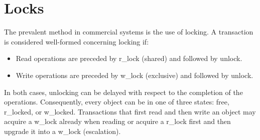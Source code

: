 \section{Locks}

The prevalent method in commercial systems is the use of locking. 
A transaction is considered well-formed concerning locking if:
\begin{itemize}
    \item Read operations are preceded by r\_lock (shared) and followed by unlock. 
    \item Write operations are preceded by w\_lock (exclusive) and followed by unlock. 
\end{itemize}
In both cases, unlocking can be delayed with respect to the completion of the operations. 
Consequently, every object can be in one of three states: free, r\_locked, or w\_locked.
Transactions that first read and then write an object may acquire a w\_lock already when reading or acquire a r\_lock first and then upgrade it into a w\_lock (escalation).

